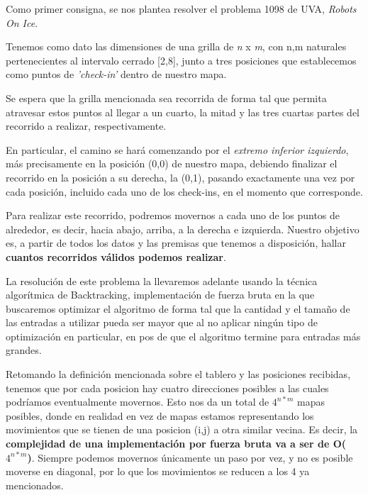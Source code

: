 Como primer consigna, se nos plantea resolver el problema 1098 de UVA, \textit{Robots On Ice}.
\newline 

Tenemos como dato las dimensiones de una grilla de \textit{n} x \textit{m}, con n,m naturales pertenecientes al intervalo cerrado [2,8], junto a tres posiciones que establecemos como puntos de \textit{'check-in'} dentro de nuestro mapa. 

Se espera que la grilla mencionada sea recorrida de forma tal que permita atravesar estos puntos al llegar a un cuarto, la mitad y las tres cuartas partes del recorrido a realizar, respectivamente. 

En particular, el camino se hará comenzando por el \textit{extremo inferior izquierdo}, más precisamente en la posición (0,0) de nuestro mapa, debiendo finalizar el recorrido en la posición a su derecha, la (0,1), pasando exactamente una vez por cada posición, incluido cada uno de los check-ins, en el momento que corresponde. 

Para realizar este recorrido, podremos movernos a cada uno de los puntos de alrededor, es decir, hacia abajo, arriba, a la derecha e izquierda.
Nuestro objetivo es, a partir de todos los datos y las premisas que tenemos a disposición, hallar \textbf{cuantos recorridos válidos podemos realizar}.  \newline

La resolución de este problema la llevaremos adelante usando la técnica algorítmica de Backtracking, implementación de fuerza bruta en la que buscaremos optimizar el algoritmo de forma tal que la cantidad y el tamaño de las entradas a utilizar pueda ser mayor que al no aplicar ningún tipo de optimización en particular, en pos de que el algoritmo termine para entradas más grandes. \newline

Retomando la definición mencionada sobre el tablero y las posiciones recibidas, tenemos que por cada posicion hay cuatro direcciones posibles a las cuales podríamos eventualmente movernos. Esto nos da un total de $4^{n*m}$ mapas posibles, donde en realidad en vez de mapas estamos representando los movimientos que se tienen de una posicion (i,j) a otra similar vecina. Es decir, la \textbf{complejidad de una implementación por fuerza bruta va a ser de O($4^{n*m}$)}. 
Siempre podemos movernos únicamente un paso por vez, y no es posible moverse en diagonal, por lo que los movimientos se reducen a los 4 ya mencionados. \newline

